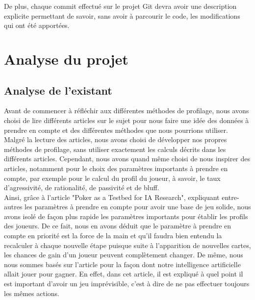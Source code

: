 \documentclass{report}
\begin{document}
De plus, chaque commit effectué sur le projet Git devra avoir une description explicite permettant de savoir, sans avoir à parcourir le code, les modifications qui ont été apportées.\par

\chapter{Analyse du projet}

\section{Analyse de l'existant}



\hspace{0.5cm}Avant de commencer à réfléchir aux différentes méthodes de profilage, nous avons choisi de lire différents articles sur le sujet pour nous faire une idée des données à prendre en compte et des différentes méthodes que nous pourrions utiliser. \\

Malgré la lecture des articles, nous avons choisi de développer nos propres méthodes de profilage, sans utiliser exactement les calculs décrits dans les différents articles. Cependant, nous avons quand même choisi de nous inspirer des articles, notamment pour le choix des paramètres importants à prendre en compte, par exemple pour le calcul du profil du joueur, à savoir, le taux d'agressivité, de rationalité, de passivité et de bluff. \\

Ainsi, grâce à l'article "Poker as a Testbed for IA Research", expliquant entre-autres les paramètres à prendre en compte pour avoir une base de jeu solide, nous avons isolé de façon plus rapide les paramètres importants pour établir les profils des joueurs. De ce fait, nous en avons déduit que le paramètre à prendre en compte en priorité est la force de la main et qu'il faudra bien entendu la recalculer à chaque nouvelle étape puisque suite à l'apparition de nouvelles cartes, les chances de gain d'un joueur peuvent complètement changer. De même, nous nous sommes basés sur l'article pour la façon dont notre intelligence artificielle allait jouer pour gagner. En effet, dans cet article, il est expliqué à quel point il est important d'avoir un jeu imprévisible, c'est à dire de ne pas effectuer toujours les mêmes actions. \\
\end{document}
